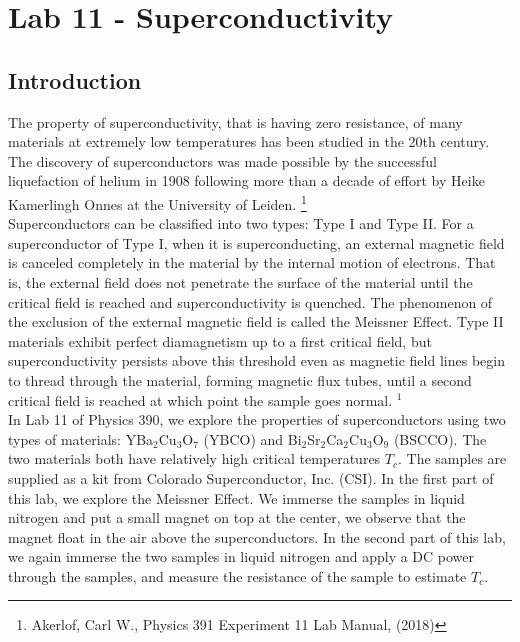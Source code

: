 \documentclass[11pt]{book}
\theoremstyle{break}
\theoremstyle{break}
\begin{document}
\newpage
\tableofcontents
{}


\chapter*{Lab 11 - Superconductivity}
\setcounter{chapter}{11}
\section{Introduction}
The property of superconductivity, that is having zero resistance, of many materials at extremely low temperatures has been studied in the 20th century. The discovery of superconductors was made possible by the successful liquefaction of helium in 1908 following more than a decade of effort by Heike Kamerlingh Onnes at the University of Leiden. \footnote{Akerlof, Carl W., Physics 391 Experiment 11 Lab Manual, (2018)} \\


Superconductors can be classified into two types: Type I and Type II.  For a superconductor of Type I, when it is superconducting, an external magnetic field is canceled completely in the material by the internal motion of electrons. That is, the external field does not penetrate the surface of the material until the critical field is reached and superconductivity is quenched. The phenomenon of the exclusion of the external magnetic field is called the Meissner Effect. Type II materials exhibit perfect diamagnetism up to a first critical field, but superconductivity persists above this threshold even as magnetic field lines begin to thread through the material, forming magnetic flux tubes, until a second critical field is reached at which point the sample goes normal. $^1$\\

In Lab 11 of Physics 390, we explore the properties of superconductors using two types of materials:  YBa$_2$Cu$_3$O$_7$ (YBCO) and Bi$_2$Sr$_2$Ca$_2$Cu$_3$O$_9$ (BSCCO). The two materials both have relatively high critical temperatures $T_c$. The samples are supplied as a kit from Colorado Superconductor, Inc. (CSI). In the first part of this lab, we explore the Meissner Effect. We immerse the samples in liquid nitrogen and put a small magnet on top at the center, we observe that the magnet float in the air above the superconductors. In the second part of this lab, we again immerse the two samples in liquid nitrogen and apply a DC power through the samples, and measure the resistance of the sample to estimate $T_c$.
\end{document}
